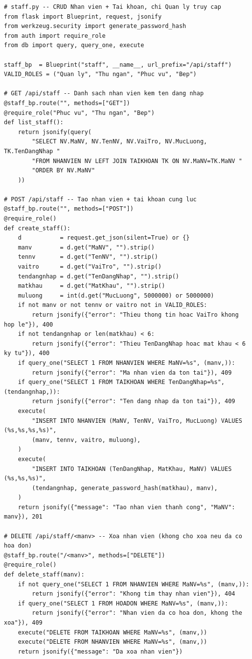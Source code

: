 \documentclass[12pt,a4paper]{report}
\begin{document}
\begin{lstlisting}[style=mypython,
  caption={File \texttt{staff.py} -- Quản lý nhân viên và tài khoản (chỉ Quản lý)},
  label=lst:python-staff]
# staff.py -- CRUD Nhan vien + Tai khoan, chi Quan ly truy cap
from flask import Blueprint, request, jsonify
from werkzeug.security import generate_password_hash
from auth import require_role
from db import query, query_one, execute

staff_bp  = Blueprint("staff", __name__, url_prefix="/api/staff")
VALID_ROLES = ("Quan ly", "Thu ngan", "Phuc vu", "Bep")

# GET /api/staff -- Danh sach nhan vien kem ten dang nhap
@staff_bp.route("", methods=["GET"])
@require_role("Phuc vu", "Thu ngan", "Bep")
def list_staff():
    return jsonify(query(
        "SELECT NV.MaNV, NV.TenNV, NV.VaiTro, NV.MucLuong, TK.TenDangNhap "
        "FROM NHANVIEN NV LEFT JOIN TAIKHOAN TK ON NV.MaNV=TK.MaNV "
        "ORDER BY NV.MaNV"
    ))

# POST /api/staff -- Tao nhan vien + tai khoan cung luc
@staff_bp.route("", methods=["POST"])
@require_role()
def create_staff():
    d           = request.get_json(silent=True) or {}
    manv        = d.get("MaNV", "").strip()
    tennv       = d.get("TenNV", "").strip()
    vaitro      = d.get("VaiTro", "").strip()
    tendangnhap = d.get("TenDangNhap", "").strip()
    matkhau     = d.get("MatKhau", "").strip()
    muluong     = int(d.get("MucLuong", 5000000) or 5000000)
    if not manv or not tennv or vaitro not in VALID_ROLES:
        return jsonify({"error": "Thieu thong tin hoac VaiTro khong hop le"}), 400
    if not tendangnhap or len(matkhau) < 6:
        return jsonify({"error": "Thieu TenDangNhap hoac mat khau < 6 ky tu"}), 400
    if query_one("SELECT 1 FROM NHANVIEN WHERE MaNV=%s", (manv,)):
        return jsonify({"error": "Ma nhan vien da ton tai"}), 409
    if query_one("SELECT 1 FROM TAIKHOAN WHERE TenDangNhap=%s", (tendangnhap,)):
        return jsonify({"error": "Ten dang nhap da ton tai"}), 409
    execute(
        "INSERT INTO NHANVIEN (MaNV, TenNV, VaiTro, MucLuong) VALUES (%s,%s,%s,%s)",
        (manv, tennv, vaitro, muluong),
    )
    execute(
        "INSERT INTO TAIKHOAN (TenDangNhap, MatKhau, MaNV) VALUES (%s,%s,%s)",
        (tendangnhap, generate_password_hash(matkhau), manv),
    )
    return jsonify({"message": "Tao nhan vien thanh cong", "MaNV": manv}), 201

# DELETE /api/staff/<manv> -- Xoa nhan vien (khong cho xoa neu da co hoa don)
@staff_bp.route("/<manv>", methods=["DELETE"])
@require_role()
def delete_staff(manv):
    if not query_one("SELECT 1 FROM NHANVIEN WHERE MaNV=%s", (manv,)):
        return jsonify({"error": "Khong tim thay nhan vien"}), 404
    if query_one("SELECT 1 FROM HOADON WHERE MaNV=%s", (manv,)):
        return jsonify({"error": "Nhan vien da co hoa don, khong the xoa"}), 409
    execute("DELETE FROM TAIKHOAN WHERE MaNV=%s", (manv,))
    execute("DELETE FROM NHANVIEN WHERE MaNV=%s", (manv,))
    return jsonify({"message": "Da xoa nhan vien"})


\end{lstlisting}
\end{document}
